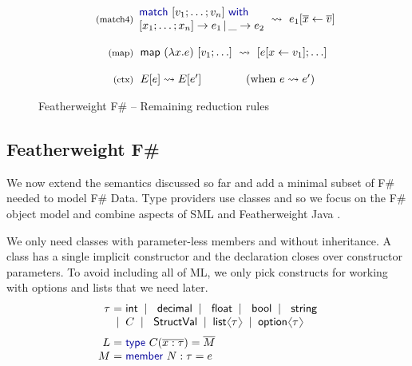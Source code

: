 \documentclass[10pt,preprint,blind,clearpagebib]{sigplanconf}
\newcommand{\langl}{\begin{picture}(4.5,7)
\put(1.1,2.5){\rotatebox{60}{\line(1,0){5.5}}}
\put(1.1,2.5){\rotatebox{300}{\line(1,0){5.5}}}
\end{picture}}
\newcommand{\rangl}{\begin{picture}(4.5,7)
\put(.9,2.5){\rotatebox{120}{\line(1,0){5.5}}}
\put(.9,2.5){\rotatebox{240}{\line(1,0){5.5}}}
\end{picture}}
\newcommand{\kvd}[1]{\textnormal{\textcolor{kvdclr}{\sffamily #1}}}
\newcommand{\ident}[1]{\textnormal{\sffamily #1}}
\newcommand{\lsep}[0]{\;\; | \;\;}
\newcommand{\narrow}[1]{\hspace{-0.7em} #1 \hspace{-0.7em}}
\newcommand{\reduce}{\rightsquigarrow}
\begin{document}
\begin{figure}
\begin{equation*}
\begin{array}{rl}
 \\
 \textnormal{\footnotesize{(match4)}}&
 \hspace{-1em}
 \begin{array}{l}
  \kvd{match}~[v_1;\ldots;v_n]~\kvd{with} \\[0em]
  [x_1;\ldots;x_n ] \rightarrow e_1 \,|\, \_ \rightarrow e_2
 \end{array} \hspace{-0.5em} ~\reduce~ e_1[\overline{x}\leftarrow\overline{v}] \\
 \\
 \textnormal{\footnotesize{(map)}}&
 \hspace{-0.4em}
 \ident{map}~(\lambda x.e)~[v_1; \ldots] ~\reduce~ [e[x\leftarrow v_1]; \ldots] \\
 \\
 \textnormal{\footnotesize{(ctx)}}&
 \hspace{-0.4em}
  E[e] \reduce E[e'] \qquad\qquad(\textnormal{when}~e \reduce e')\\
\end{array}
\end{equation*}

\caption{Featherweight F\# -- Remaining reduction rules}
\label{fig:ff-reduction}
\vspace{-1em}
\end{figure}


\subsection{Featherweight F\#}
\label{sec:formal-ff}

We now extend the semantics discussed so far and add a minimal subset of F\# needed to model F\# 
Data. Type providers use classes and so we focus on the F\# object model and combine aspects of SML 
\cite{sml} and Featherweight Java \cite{fwjava}. 

We only need classes with parameter-less members and without inheritance. A class has a single 
implicit constructor and the declaration closes over constructor parameters. To avoid including all 
of ML, we only pick constructs for working with options and lists that we need later.
%
\begin{equation*}
\begin{array}{rcl}
 \tau &\narrow{=}& \ident{int} \lsep \ident{decimal} \lsep \ident{float} \lsep \ident{bool} \lsep \ident{string} \\[0.0em]
      &\narrow{|}& C \lsep \ident{StructVal} \lsep \ident{list}\langl\tau\rangl \lsep \ident{option}\langl\tau\rangl \\[0.6em]
 L &\narrow{=}& \kvd{type}~C(\overline{x:\tau}) = \overline{M} \\[0.0em]
 M &\narrow{=}& \kvd{member}~N:\tau=e
\end{array}
\end{equation*}
\end{document}

